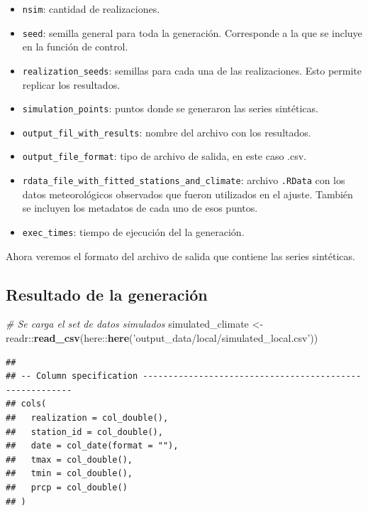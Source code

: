 \documentclass[
]{article}
\newenvironment{Shaded}{}{}
\newcommand{\CommentTok}[1]{\textcolor[rgb]{0.38,0.63,0.69}{\textit{#1}}}
\newcommand{\KeywordTok}[1]{\textcolor[rgb]{0.00,0.44,0.13}{\textbf{#1}}}
\newcommand{\NormalTok}[1]{#1}
\newcommand{\OperatorTok}[1]{\textcolor[rgb]{0.40,0.40,0.40}{#1}}
\newcommand{\StringTok}[1]{\textcolor[rgb]{0.25,0.44,0.63}{#1}}
\providecommand{\tightlist}{%
  \setlength{\itemsep}{0pt}\setlength{\parskip}{0pt}}
\begin{document}
\begin{itemize}
\tightlist
\item
  \texttt{nsim}: cantidad de realizaciones.
\item
  \texttt{seed}: semilla general para toda la generación. Corresponde a la que se incluye en la función de control.
\item
  \texttt{realization\_seeds}: semillas para cada una de las realizaciones. Esto permite replicar los resultados.
\item
  \texttt{simulation\_points}: puntos donde se generaron las series sintéticas.
\item
  \texttt{output\_fil\_with\_results}: nombre del archivo con los resultados.
\item
  \texttt{output\_file\_format}: tipo de archivo de salida, en este caso .csv.
\item
  \texttt{rdata\_file\_with\_fitted\_stations\_and\_climate}: archivo \texttt{.RData} con los datos meteorológicos observados que fueron utilizados en el ajuste. También se incluyen los metadatos de cada uno de esos puntos.
\item
  \texttt{exec\_times}: tiempo de ejecución del la generación.
\end{itemize}

Ahora veremos el formato del archivo de salida que contiene las series sintéticas.

\hypertarget{resultado-de-la-generaciuxf3n}{%
\subsection{Resultado de la generación}\label{resultado-de-la-generaciuxf3n}}

\begin{Shaded}
\begin{Highlighting}[]
\CommentTok{# Se carga el set de datos simulados}
\NormalTok{simulated_climate <-}\StringTok{ }\NormalTok{readr}\OperatorTok{::}\KeywordTok{read_csv}\NormalTok{(here}\OperatorTok{::}\KeywordTok{here}\NormalTok{(}\StringTok{'output_data/local/simulated_local.csv'}\NormalTok{)) }
\end{Highlighting}
\end{Shaded}

\begin{verbatim}
## 
## -- Column specification --------------------------------------------------------
## cols(
##   realization = col_double(),
##   station_id = col_double(),
##   date = col_date(format = ""),
##   tmax = col_double(),
##   tmin = col_double(),
##   prcp = col_double()
## )
\end{verbatim}
\end{document}
